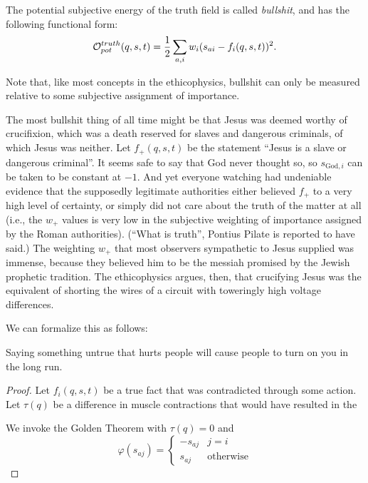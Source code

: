 \documentclass{article}
\begin{document}
The potential subjective energy of the truth field is called
{\em bullshit}, and has the following functional form:
$${\mathcal O}_{pot}^{truth}(q, s, t) = \frac{1}{2} \sum_{a, i} w_i (s_{ai} -
f_i(q, s, t))^2.$$

Note that, like most concepts in the ethicophysics, bullshit can only
be measured relative to some subjective assignment of importance.

The most bullshit thing of all time might be that Jesus was deemed
worthy of crucifixion, which was a death reserved for slaves and
dangerous criminals, of which Jesus was neither. Let $f_+(q, s, t)$ be
the statement ``Jesus is a slave or dangerous criminal''. It seems
safe to say that God never thought so, so $s_{\mathrm{God}, i}$ can be
taken to be constant at $-1$. And yet everyone watching had undeniable
evidence that the supposedly legitimate authorities either believed
$f_+$ to a very high level of certainty, or simply did not care about
the truth of the matter at all (i.e., the $w_+$ values is very low in
the subjective weighting of importance assigned by the Roman
authorities). (``What is truth'', Pontius Pilate is reported to have
said.) The weighting $w_+$ that most observers sympathetic to Jesus
supplied was immense, because they believed him to be the messiah
promised by the Jewish prophetic tradition. The ethicophysics argues,
then, that crucifying Jesus was the equivalent of shorting the wires
of a circuit with toweringly high voltage differences.

We can formalize this as follows:
\begin{thm}
  Saying something untrue that hurts people will cause people to turn
  on you in the long run.
\end{thm}
\begin{proof}
  Let $f_i(q, s, t)$ be a true fact that was contradicted through some
  action. Let $\tau(q)$ be a difference in muscle contractions that
  would have resulted in the
  
  We invoke the Golden Theorem with $\tau(q) = 0$ and
  $$\varphi(s_{aj}) = \begin{cases} -s_{aj} & j = i \\ s_{aj} &
    \mbox{otherwise} \end{cases}$$
\end{proof}

 
\end{document}
